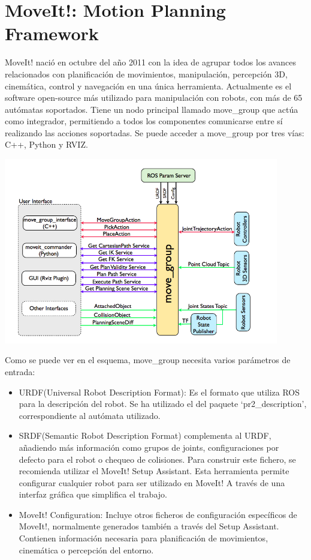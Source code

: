 \documentclass[12pt,spanish,chapterprefix, numbers=noenddot]{book}
\numberwithin{equation}{section}
\numberwithin{figure}{section}
\begin{document}
\section{MoveIt!: Motion Planning Framework}
MoveIt! nació en octubre del año 2011 con la idea de agrupar todos los avances relacionados con planificación de movimientos, manipulación, percepción 3D, cinemática, control y navegación en una única herramienta. Actualmente es el software open-source más utilizado para manipulación con robots, con más de 65 autómatas soportados. 
Tiene un nodo principal llamado move\_group que actúa como integrador, permitiendo a todos los componentes comunicarse entre sí realizando las acciones soportadas. 
Se puede acceder a move\_group por tres vías: C++, Python y RVIZ.
\begin{center}
\includegraphics[width=12cm]{Figs/moveGroup.png}
\end{center}
Como se puede ver en el esquema, move\_group necesita varios parámetros de entrada:
\begin{itemize}
\item URDF(Universal Robot Description Format): Es el formato que utiliza ROS para la descripción del robot. Se ha utilizado el del paquete ‘pr2\_description’, correspondiente al autómata utilizado.
\item SRDF(Semantic Robot Description Format) complementa al URDF, añadiendo más información como grupos de joints, configuraciones por defecto para el robot o chequeo de colisiones. Para construir este fichero, se recomienda utilizar el MoveIt! Setup Assistant. Esta herramienta permite configurar cualquier robot para ser utilizado en MoveIt! A través de una interfaz gráfica que simplifica el trabajo. 
\item MoveIt! Configuration: Incluye otros ficheros de configuración específicos de MoveIt!, normalmente generados también a través del Setup Assistant. Contienen información necesaria para planificación de movimientos, cinemática o percepción del entorno.
\end{itemize}
\end{document}

